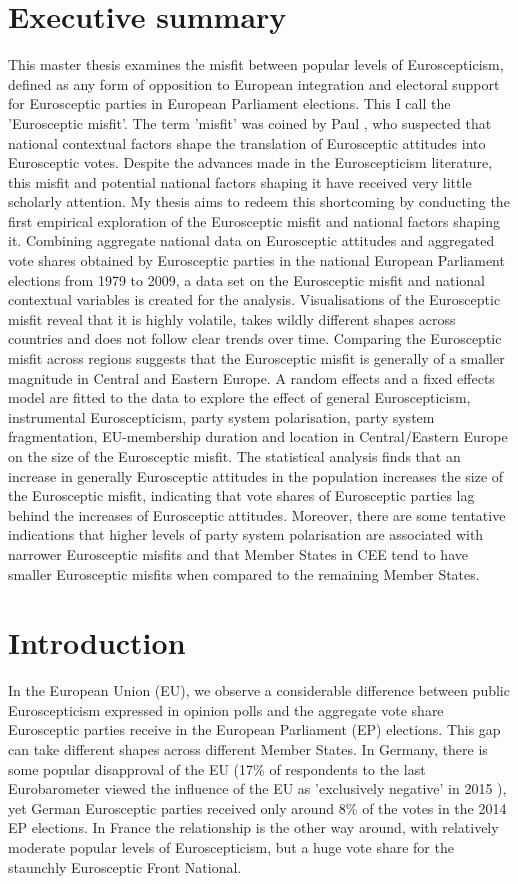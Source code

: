 \chapter{Executive summary}
This master thesis examines the misfit between popular levels of Euroscepticism, defined as any form of opposition to European integration and electoral support for Eurosceptic parties in European Parliament elections. This I call the 'Eurosceptic misfit'. The term 'misfit' was coined by Paul , who suspected that national contextual factors shape the translation of Eurosceptic attitudes into Eurosceptic votes. Despite the advances made in the Euroscepticism literature, this misfit and potential national factors shaping it have received very little scholarly attention. My thesis aims to redeem this shortcoming by conducting the first empirical exploration of the Eurosceptic misfit and national factors shaping it. Combining aggregate national data on Eurosceptic attitudes and aggregated vote shares obtained by Eurosceptic parties in the national European Parliament elections from 1979 to 2009, a data set on the Eurosceptic misfit and national contextual variables is created for the analysis. Visualisations of the Eurosceptic misfit reveal that it is highly volatile, takes wildly different shapes across countries and does not follow clear trends over time. Comparing the Eurosceptic misfit across regions suggests that the Eurosceptic misfit is generally of a smaller magnitude in Central and Eastern Europe. A random effects and a fixed effects model are fitted to the data to explore the effect of general Euroscepticism, instrumental Euroscepticism, party system polarisation, party system fragmentation, EU-membership duration and location in Central/Eastern Europe on the size of the Eurosceptic misfit. The statistical analysis finds that an increase in generally Eurosceptic attitudes in the population increases the size of the Eurosceptic misfit, indicating that vote shares of Eurosceptic parties lag behind the increases of Eurosceptic attitudes. Moreover, there are some tentative indications that higher levels of party system polarisation are associated with narrower Eurosceptic misfits and that Member States in CEE tend to have smaller Eurosceptic misfits when compared to the remaining Member States.

\chapter{Introduction}
In the European Union (EU), we observe a considerable difference between public Euroscepticism expressed in opinion polls and the aggregate vote share Eurosceptic parties receive in the European Parliament (EP) elections. This gap can take different shapes across different Member States. In Germany, there is some popular disapproval of the EU (17\% of respondents to the last Eurobarometer viewed the influence of the EU as 'exclusively negative' in 2015 \cite{Commission2015}), yet German Eurosceptic parties received only around 8\% of the votes in the 2014 EP elections. In France the relationship is the other way around, with relatively moderate popular levels of Euroscepticism, but a huge vote share for the staunchly Eurosceptic Front National.

